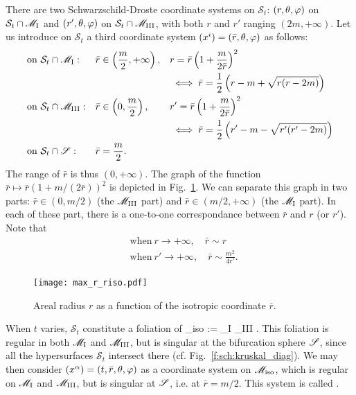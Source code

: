 There are two Schwarzschild-Droste coordinate systems on $\mathcal{S}_t$:
$(r,\theta,\varphi)$ on $\mathcal{S}_t\cap \mathscr{M}_{\rm I}$ and $(r',\theta,\varphi)$ on
$\mathcal{S}_t\cap \mathscr{M}_{\rm III}$, with both $r$ and $r'$ ranging
$(2m,+\infty)$.
Let us introduce on $\mathcal{S}_t$ a third coordinate system $(x^i)=(\bar{r},\theta,\varphi)$
as follows:
\begin{subequations}
\begin{align}
& \mbox{on}\ \mathcal{S}_t\cap \mathscr{M}_{\rm I}:  & & \bar{r} \in \left(\frac{m}{2}, +\infty \right), & &
     r = \bar{r} \left( 1 + \frac{m}{2\bar{r}} \right)^2 \label{e:max:r_riso}\\
& & & & & \iff \bar{r} = \frac{1}{2} \left( r - m + \sqrt{r (r-2m)} \right) \\
&\mbox{on}\ \mathcal{S}_t\cap  \mathscr{M}_{\rm III}:& &
    \bar{r} \in \left(0, \frac{m}{2} \right), & &
    r' = \bar{r} \left( 1 + \frac{m}{2\bar{r}} \right)^2 \label{e:max:rp_riso} \\
& & & & & \iff \bar{r} = \frac{1}{2} \left( r' - m - \sqrt{r' (r'-2m)} \right) \\
&\mbox{on}\ \mathcal{S}_t\cap \mathscr{S} : & & \bar{r} = \frac{m}{2} .& &
\end{align}
\end{subequations}
The range of $\bar{r}$ is thus $(0,+\infty)$.
The graph of the function
$\bar{r} \mapsto \bar{r}(1+m/(2\bar{r}))^2$ is depicted in
Fig.~\ref{f:max:r_riso}. We can separate this graph in two parts:
$\bar{r}\in (0,m/2)$ (the $\mathscr{M}_{\rm III}$ part) and $\bar{r}\in (m/2, +\infty)$
(the $\mathscr{M}_{\rm I}$ part). In each of these part, there is a one-to-one
correspondance between $\bar{r}$ and $r$ (or $r'$). Note that
\begin{subequations}
\begin{align}
    & \mbox{when}\ r\rightarrow +\infty,\quad \bar{r} \sim r \\
    & \mbox{when}\ r'\rightarrow +\infty,\quad \bar{r} \sim \frac{m^2}{4 r'} .
\end{align}
\end{subequations}

\begin{figure}
\centerline{\texttt{[image: max\_r\_riso.pdf]}}
\caption[]{\label{f:max:r_riso} \footnotesize
Areal radius $r$ as a function of the isotropic coordinate $\bar{r}$.}
\end{figure}

When $t$ varies, $\mathcal{S}_t$ constitute a foliation of
\be
    \M_{\rm iso} := \M_{\rm I} \cup \Sp \cup \M_{\rm III} .
\ee
This foliation is regular in both $\mathscr{M}_{\rm I}$ and $\mathscr{M}_{\rm III}$, but is
singular at the bifurcation sphere $\mathscr{S}$, since all
the hypersurfaces $\mathcal{S}_t$ intersect there (cf. Fig.~\ref{f:sch:kruskal_diag}).
We may then consider $(x^\alpha) = (t,\bar{r},\theta,\varphi)$ as a coordinate system
on $\mathscr{M}_{\rm iso}$, which is regular on $\mathscr{M}_{\rm I}$ and $\mathscr{M}_{\rm III}$,
but is singular at $\mathscr{S}$, i.e. at $\bar{r}=m/2$. This system is called
.

